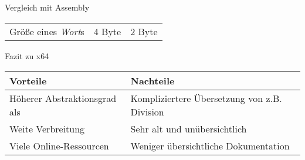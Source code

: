 \begin{frame}{Vergleich mit \riscv{} Assembly}
\begin{tabular}{l|l|l}
		Größe eines \emph{Wort}s   & 4 Byte                                                                                                                                                           & 2 Byte                                                                                                                                                                                                                                                                   \\
	\end{tabular}
\end{frame}

\begin{frame}{Fazit zu x64}
	\begin{table}[h]
		\begin{tabular}{p{6cm}|p{6cm}}
			\cellcolor{green!20} Vorteile         & \cellcolor{red!20} Nachteile                 \\
			\hline
			Höherer Abstraktionsgrad als \riscv{} & Kompliziertere Übersetzung von z.B. Division \\
			Weite Verbreitung                     & Sehr alt und unübersichtlich                 \\
			Viele Online-Ressourcen               & Weniger übersichtliche Dokumentation         \\
		\end{tabular}
	\end{table}
\end{frame}
